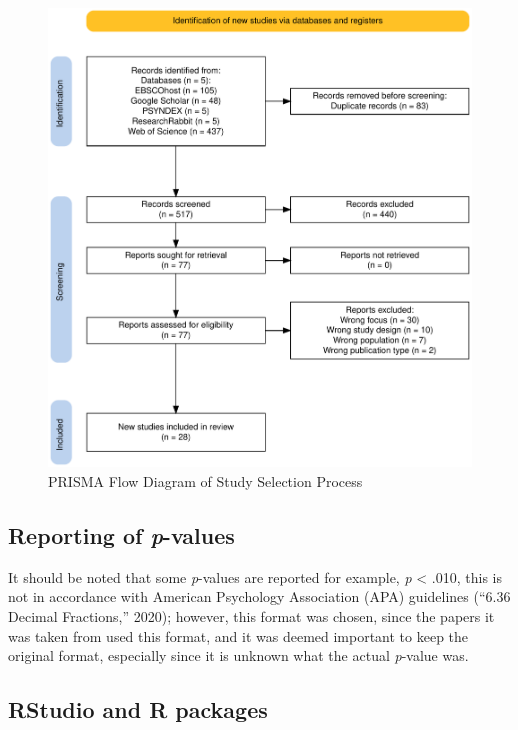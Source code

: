 \documentclass[
  stu, a4paper, 12pt,mask,floatsintext]{apa7}
\begin{document}
\begin{figure}
\centering
\includegraphics{files/prisma.pdf}
\caption{\label{fig:prisma}PRISMA Flow Diagram of Study Selection Process}
\end{figure}

\subsection{\texorpdfstring{Reporting of \emph{p}-values}{Reporting of p-values}}\label{reporting-of-p-values}

It should be noted that some \emph{p}-values are reported for example, \emph{p} \textless{} .010, this is not in accordance with American Psychology Association (APA) guidelines ({``6.36 {Decimal Fractions},''} 2020); however, this format was chosen, since the papers it was taken from used this format, and it was deemed important to keep the original format, especially since it is unknown what the actual \emph{p}-value was.

\subsection{RStudio and R packages}\label{rstudio-and-r-packages}
\end{document}
